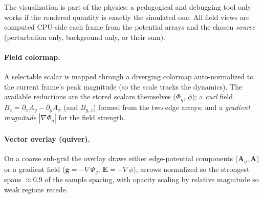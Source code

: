 \documentclass[11pt]{article}
\newcommand{\Phig}{\Phi_g}                 %
\newcommand{\Ag}{\mathbf{A}_g}             %
\newcommand{\vv}[1]{\mathbf{#1}}           %
\begin{document}
The visualization is part of the physics: a pedagogical and debugging tool only
works if the rendered quantity is exactly the simulated one. All field views are
computed CPU-side each frame from the potential arrays and the chosen
\emph{source} (perturbation only, background only, or their sum).

\paragraph{Field colormap.} A selectable scalar is mapped through a diverging
colormap auto-normalized to the current frame's peak magnitude (so the scale
tracks the dynamics). The available reductions are the stored scalars themselves
($\Phig$, $\phi$); a \emph{curl} field
$B_z=\partial_xA_y-\partial_yA_x$ (and $B_{g,z}$) formed from the two edge
arrays; and a \emph{gradient magnitude} $|\nabla\Phig|$ for the field strength.

\paragraph{Vector overlay (quiver).} On a coarse sub-grid the overlay draws
either edge-potential components ($\Ag,\vv A$) or a gradient field
($\vv g=-\nabla\Phig$, $\vv E=-\nabla\phi$), arrows normalized so the strongest
spans $\approx0.9$ of the sample spacing, with opacity scaling by relative
magnitude so weak regions recede.
\end{document}
